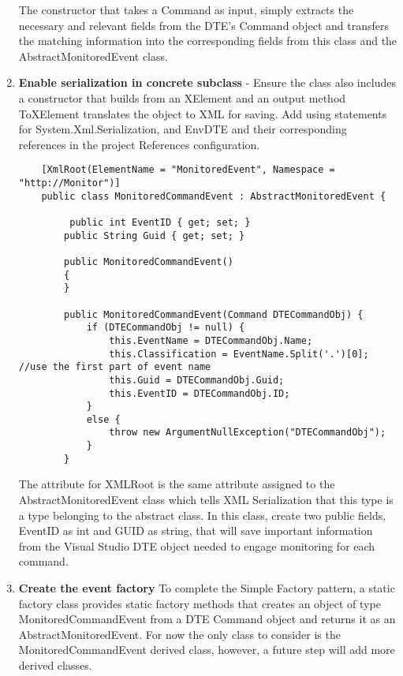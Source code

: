 \begin{enumerate}
The constructor that takes a Command as input, simply extracts the necessary and relevant fields from the DTE's Command object and transfers the matching information into the corresponding fields from this class and the AbstractMonitoredEvent class.  

\item {\bf Enable serialization in concrete subclass} -
Ensure the class also includes a constructor that builds from an XElement and an output method ToXElement translates the object to XML for saving. Add using statements for System.Xml.Serialization, and EnvDTE and their corresponding references in the project References configuration. 

\begin{lstlisting}
    [XmlRoot(ElementName = "MonitoredEvent", Namespace = "http://Monitor")]
    public class MonitoredCommandEvent : AbstractMonitoredEvent {

         public int EventID { get; set; }
        public String Guid { get; set; }

        public MonitoredCommandEvent()
        {
        }

        public MonitoredCommandEvent(Command DTECommandObj) {
            if (DTECommandObj != null) {
                this.EventName = DTECommandObj.Name;
                this.Classification = EventName.Split('.')[0];  //use the first part of event name
                this.Guid = DTECommandObj.Guid;
                this.EventID = DTECommandObj.ID;
            }
            else {
                throw new ArgumentNullException("DTECommandObj");
            }
        }
\end{lstlisting}

 The attribute for XMLRoot is the same attribute assigned to the AbstractMonitoredEvent class which tells XML Serialization that this type is a type belonging to the abstract class.  In this class, create two public fields, EventID as int and GUID as string, that will save important information from the Visual Studio DTE object needed to engage monitoring for each command.  

\item {\bf Create the event factory}
To complete the Simple Factory pattern, a static factory class provides static factory methods that creates an object of type  MonitoredCommandEvent from a DTE Command object and returns it as an AbstractMonitoredEvent.  For now the only class to consider is the MonitoredCommandEvent derived class, however, a future step will add more derived classes.  
\end{enumerate}

